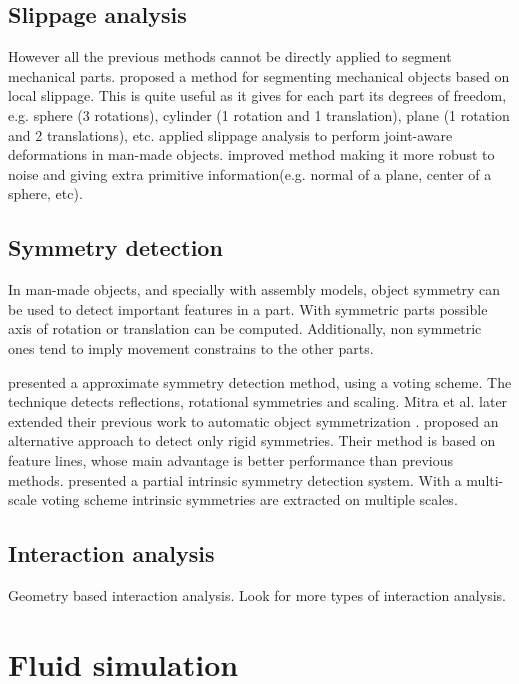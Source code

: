 \subsection{Slippage analysis}
\label{SlippageAnalysis}

However all the previous methods cannot be directly applied to segment mechanical parts.
\cite{Gelfand2004} proposed a method for segmenting mechanical objects based on local slippage.
This is quite useful as it gives for each part its degrees of freedom, e.g. sphere (3 rotations), cylinder (1 rotation and 1 translation), plane (1 rotation and 2 translations), etc.
\cite{Xu2009} applied slippage analysis to perform joint-aware deformations in man-made objects.
\cite{Yi2014} improved \cite{Gelfand2004} method making it more robust to noise and giving extra primitive information(e.g. normal of a plane, center of a sphere, etc).

\subsection{Symmetry detection}

In man-made objects, and specially with assembly models, object symmetry can be used to detect important features in a part.
With symmetric parts possible axis of rotation or translation can be computed.
Additionally, non symmetric ones tend to imply movement constrains to the other parts.

\cite{Mitra2006} presented a approximate symmetry detection method, using a voting scheme.
The technique detects reflections, rotational symmetries and scaling.
Mitra et al. later extended their previous work to automatic object symmetrization \cite{Mitra2007}.
\cite{Bokeloh2009} proposed an alternative approach to detect only rigid symmetries.
Their method is based on feature lines, whose main advantage is better performance than previous methods.
\cite{Xu2012} presented a partial intrinsic symmetry detection system.
With a multi-scale voting scheme intrinsic symmetries are extracted on multiple scales.

\subsection{Interaction analysis}

Geometry based interaction analysis.
Look for more types of interaction analysis.

\section{Fluid simulation}
\label{prevWorkFluidSim}

